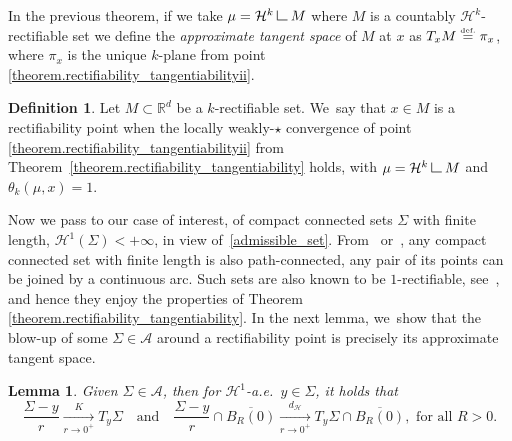 \documentclass[10pt]{amsart}
\let\ts\textstyle
\newtheorem{lemma}[theorem]{Lemma}
\theoremstyle{definition}
\newtheorem{definition}[theorem]{Definition}
\newcommand{\eqdef}{\ensuremath{\stackrel{\mbox{\upshape\tiny def.}}{=}}}
\newcommand\LM[1]{\hbox{\vrule width.5pt \vbox to#1pt{\vfill \hrule width#1pt height.5pt}}}
\newcommand\LL{{\mathchoice {\>\LM7\>}{\>\LM7\>}{\,\LM5\,}{\,\LM{3.35}\,}}}
\newcommand{\mres}{\LL}
\newcommand\cH{\mathcal{H}}
\newcommand{\RR}{\mathbb{R}}
\newcommand{\distH}{d_{\mathcal{H}}}
\begin{document}
In the previous theorem, if we take $\mu = \cH^k\mres M$ where $M$ is a countably $\cH^k$\nobreakdash-rectifiable set we define the \emph{approximate tangent space} of $M$ at $x$ as $T_x M \eqdef \pi_x$, where $\pi_x$ is the unique $k$-plane from point \eqref{theorem.rectifiability_tangentiabilityii}.

\begin{definition}\label{definiton.rectifiability_point}
Let $M\subset \RR^d$ be a $k$-rectifiable set. We~say that $x \in M$ is a rectifiability point when the locally weakly-$\star$ convergence of point \eqref{theorem.rectifiability_tangentiabilityii} from Theorem~\ref{theorem.rectifiability_tangentiability} holds, with $\mu = \cH^k\mres M$ and $\theta_k(\mu,x)=1$.
\end{definition}

Now we pass to our case of interest, of compact connected sets $\Sigma$ with finite length, $\mathcal{H}^1(\Sigma) < +\infty$, in view of~\eqref{admissible_set}. From~\cite[Prop.\,30.1 \& Cor.\,30.2]{david2006singular} or~\cite[Th.\,4.4]{alberti2017structure}, any compact connected set with finite length is also path-connected, \ie any pair of its points can be joined by a continuous arc. Such sets are also known to be $1$-rectifiable, see~\cite[Th.\,4.4.8]{ambrosio2004topics}, and hence they enjoy the properties of Theorem \ref{theorem.rectifiability_tangentiability}. In the next lemma, we~show that the blow-up of some $\Sigma \in \mathcal{A}$ around a rectifiability point is precisely its approximate tangent space.

\begin{lemma}\label{lemma.blowup_domain_measure}
Given $\Sigma \in \mathcal{A}$, then for $\cH^1$-a.e.\ $y \in \Sigma$, it holds that
\[
\frac{\Sigma - y}{r} \xrightarrow[r \to 0^+]{\ts K} T_y\Sigma
\quad \text{and} \quad
\frac{\Sigma - y}{r}\cap \overline{B_R(0)} \xrightarrow[r \to 0^+]{\ts\distH} T_y\Sigma\cap \overline{B_R(0)}, \text{ for all $R>0$.}
\]
\end{lemma}
\end{document}
